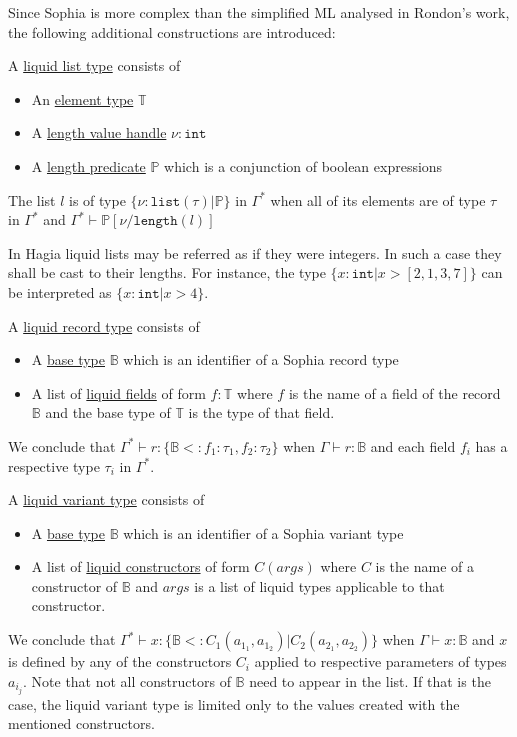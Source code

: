 Since Sophia is more complex than the simplified ML analysed in Rondon's work,
the following additional constructions are introduced:

\begin{defi}
  A \underline{liquid list type} consists of
  \begin{itemize}
  \item An \underline{element type} $\mathbb{T}$
  \item A \underline{length value handle} $\nu : \texttt{int}$
  \item A \underline{length predicate} $\mathbb{P}$ which is a conjunction of
    boolean expressions
  \end{itemize}
  The list $l$ is of type $\{\nu : \texttt{list}(\tau) | \mathbb{P}\}$ in
  $\Gamma^*$ when all of its elements are of type $\tau$ in $\Gamma^*$ and
  $\Gamma^* \vdash \mathbb{P}[\nu/\texttt{length}(l)]$
\end{defi}

In Hagia liquid lists may be referred as if they were integers. In such a case
they shall be cast to their lengths. For instance, the type $\{x : \texttt{int} |
  x > [2,1,3,7]\}$ can be interpreted as $\{x : \texttt{int} | x > 4\}$.

\begin{defi}
  A \underline{liquid record type} consists of
  \begin{itemize}
  \item A \underline{base type} $\mathbb{B}$ which is an identifier of a Sophia
    record type
  \item A list of \underline{liquid fields} of form $f : \mathbb{T}$ where
    $f$ is the name of a field of the record $\mathbb{B}$ and the base type of
    $\mathbb{T}$ is the type of that field.
  \end{itemize}

  We conclude that $\Gamma^* \vdash r : \{\mathbb{B} <: f_1 : \tau_1, f_2 :
  \tau_2\}$ when $\Gamma \vdash r : \mathbb{B}$ and each field $f_i$ has a
  respective type $\tau_i$ in $\Gamma^*$.
\end{defi}


\begin{defi}
  A \underline{liquid variant type} consists of
  \begin{itemize}
  \item A \underline{base type} $\mathbb{B}$ which is an identifier of a Sophia
    variant type
  \item A list of \underline{liquid constructors} of form $C(args)$ where $C$
    is the name of a constructor of $\mathbb{B}$ and $args$ is a list of liquid
    types applicable to that constructor.
  \end{itemize}

  We conclude that $\Gamma^* \vdash x : \{\mathbb{B} <: C_1(a_{1_1}, a_{1_2}) |
  C_2(a_{2_1}, a_{2_2})\}$ when $\Gamma \vdash x : \mathbb{B}$ and $x$ is
  defined by any of the constructors $C_i$ applied to respective parameters of
  types $a_{i_j}$. Note that not all constructors of $\mathbb{B}$ need to appear
  in the list. If that is the case, the liquid variant type is limited only to
  the values created with the mentioned constructors.
\end{defi}

